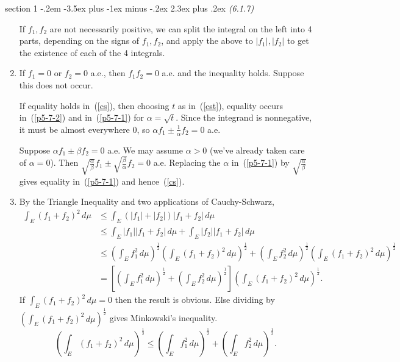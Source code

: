 \documentclass[12pt]{article}
\makeatletter
\theoremstyle{norm}
\newcommand{\rc}[1]{\frac{1}{#1}}
\newcommand{\al}[0]{\alpha}
\newcommand{\be}[0]{\beta}
\newcommand{\ba}[1]{\left[ {#1} \right]}
\newcommand{\pa}[1]{\left( {#1} \right)}
\newenvironment{problem}{\@startsection
       {section}
       {1}
       {-.2em}
       {-3.5ex plus -1ex minus -.2ex}
       {2.3ex plus .2ex}
       {\pagebreak[3]%
       \large\bf\noindent{Problem }
       }
       }
       {%
       }
\makeatother
\begin{document}
\begin{problem}{\it(6.1.7)}
\begin{enumerate}
If $f_1,f_2$ are not necessarily positive, we can split the integral on the left into 4 parts, depending on the signs of $f_1,f_2$, and apply the above to $|f_1|,|f_2|$ to get the existence of each of the 4 integrals.
\item
If $f_1=0$ or $f_2=0$ a.e., then $f_1f_2=0$ a.e. and the inequality holds. Suppose this does not occur.

If equality holds in~(\ref{cs}), then choosing $t$ as in~(\ref{cst}), equality occurs in~(\ref{p5-7-2}) and in~(\ref{p5-7-1}) for $\al=\sqrt t$. Since the integrand is nonnegative, it must be almost everywhere 0, so $\al f_1\pm \rc{\al}f_2=0$ a.e.

Suppose $\al f_1\pm \be f_2=0$ a.e. We may assume $\al>0$ (we've already taken care of $\al=0$). Then $\sqrt{\frac{\al}{\be}}f_1\pm \sqrt{\frac{\be}{\al}}f_2=0$ a.e. Replacing the $\al$ in~(\ref{p5-7-1}) by $\sqrt{\frac{\al}{\be}}$ gives equality in~(\ref{p5-7-1}) and hence~(\ref{cs}).
\item
By the Triangle Inequality and two applications of Cauchy-Schwarz,
\begin{align*}
\int_E(f_1+f_2)^2 \,d\mu
&\le \int_E(|f_1|+|f_2|)|f_1+f_2| \,d\mu\\
&\le \int_E|f_1||f_1+f_2|\,d\mu+\int_E|f_2||f_1+f_2|\,d\mu\\
&\le \pa{\int_E f_1^2\,d\mu}^{\rc2}\pa{\int_E(f_1+f_2)^2\,d\mu}^{\rc2}
+\pa{\int_E f_2^2\,d\mu}^{\rc2}\pa{\int_E(f_1+f_2)^2\,d\mu}^{\rc2}\\
&=\ba{\pa{\int_E f_1^2\,d\mu}^{\rc2}+\pa{\int_E f_2^2\,d\mu}^{\rc 2}}\pa{\int_E(f_1+f_2)^2\,d\mu}^{\rc 2}.
\end{align*}
If $\int_E(f_1+f_2)^2 \,d\mu=0$ then the result is obvious. Else
dividing by $\pa{\int_E(f_1+f_2)^2 \,d\mu}^{\rc 2}$ gives Minkowski's inequality.
\[
\pa{\int_E (f_1+f_2)^2\,d\mu}^{\rc 2}\le \pa{\int_E f_1^2\,d\mu}^{\rc 2}+\pa{\int_E f_2^2\,d\mu}^{\rc 2}.
\]
\end{enumerate}

\end{problem}
\end{document}
